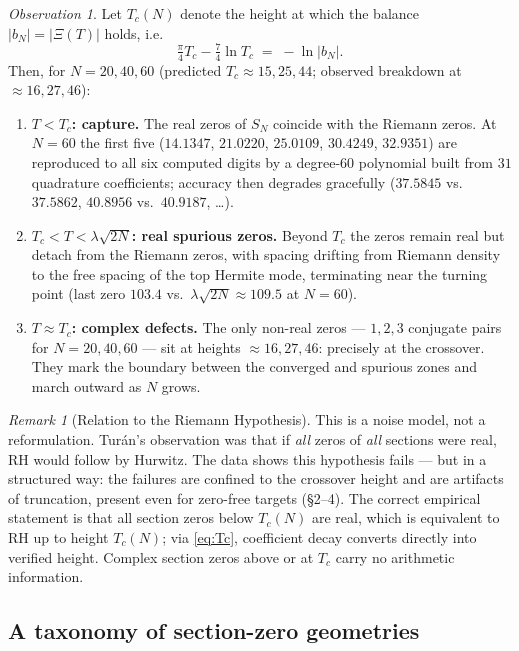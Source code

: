 \documentclass[11pt]{article}
\theoremstyle{remark}
\newtheorem{remark}[theorem]{Remark}
\newtheorem{observation}[theorem]{Observation}
\begin{document}
\begin{observation}
Let $T_c(N)$ denote the height at which the balance $|b_N| = |\Xi(T)|$ holds, i.e.
\begin{equation}
\tfrac{\pi}{4} T_c - \tfrac{7}{4}\ln T_c \;=\; -\ln |b_N|.
\label{eq:Tc}
\end{equation}
Then, for $N = 20, 40, 60$ (predicted $T_c \approx 15, 25, 44$; observed breakdown at $\approx 16, 27, 46$):
\begin{enumerate}
\item \textbf{$T < T_c$: capture.} The real zeros of $S_N$ coincide with the Riemann zeros. At $N = 60$ the first five ($14.1347$, $21.0220$, $25.0109$, $30.4249$, $32.9351$) are reproduced to all six computed digits by a degree-$60$ polynomial built from $31$ quadrature coefficients; accuracy then degrades gracefully ($37.5845$ vs.\ $37.5862$, $40.8956$ vs.\ $40.9187$, \dots).
\item \textbf{$T_c < T < \lambda\sqrt{2N}$: real spurious zeros.} Beyond $T_c$ the zeros remain real but detach from the Riemann zeros, with spacing drifting from Riemann density to the free spacing of the top Hermite mode, terminating near the turning point (last zero $103.4$ vs.\ $\lambda\sqrt{2N} \approx 109.5$ at $N=60$).
\item \textbf{$T \approx T_c$: complex defects.} The only non-real zeros --- $1, 2, 3$ conjugate pairs for $N = 20, 40, 60$ --- sit at heights $\approx 16, 27, 46$: precisely at the crossover. They mark the boundary between the converged and spurious zones and march outward as $N$ grows.
\end{enumerate}
\end{observation}

\begin{remark}[Relation to the Riemann Hypothesis]
This is a noise model, not a reformulation. Tur\'an's observation was that if \emph{all} zeros of \emph{all} sections were real, RH would follow by Hurwitz. The data shows this hypothesis fails --- but in a structured way: the failures are confined to the crossover height and are artifacts of truncation, present even for zero-free targets (\S2--4). The correct empirical statement is that all section zeros below $T_c(N)$ are real, which is equivalent to RH up to height $T_c(N)$; via \eqref{eq:Tc}, coefficient decay converts directly into verified height. Complex section zeros above or at $T_c$ carry no arithmetic information.
\end{remark}

\subsection{A taxonomy of section-zero geometries}
\end{document}
